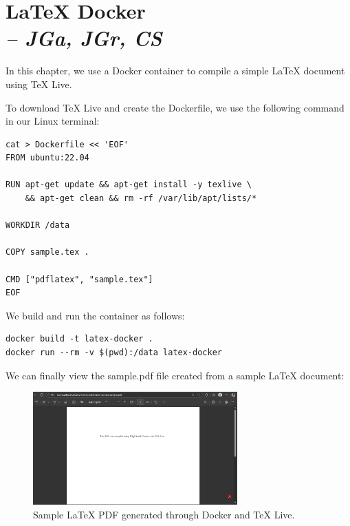 \chapter{LaTeX Docker \\
\small{\textit{-- JGa, JGr, CS}}
\label{Chapter::LaTeXDocker}}

In this chapter, we use a Docker container to compile a simple LaTeX document using TeX Live.

To download TeX Live and create the Dockerfile, we use the following command in our Linux terminal:

\begin{verbatim}
cat > Dockerfile << 'EOF'
FROM ubuntu:22.04

RUN apt-get update && apt-get install -y texlive \
    && apt-get clean && rm -rf /var/lib/apt/lists/*

WORKDIR /data

COPY sample.tex .

CMD ["pdflatex", "sample.tex"]
EOF
\end{verbatim}

We build and run the container as follows:

\begin{verbatim}
docker build -t latex-docker .
docker run --rm -v $(pwd):/data latex-docker
\end{verbatim}

We can finally view the sample.pdf file created from a sample LaTeX document: 
\begin{figure}[h]
  \centering
  \includegraphics[width=0.7\textwidth]{png/sample_pdf_screenshot.png}
  \caption{Sample LaTeX PDF generated through Docker and TeX Live.}
  \label{fig:sample_pdf}
\end{figure}
